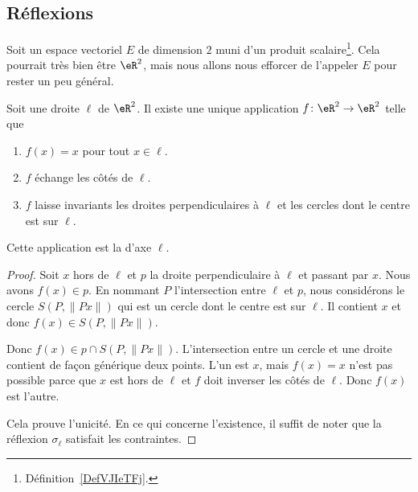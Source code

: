 \subsection{Réflexions}

Soit un espace vectoriel \( E\) de dimension \( 2\) muni d'un produit scalaire\footnote{Définition~\ref{DefVJIeTFj}.}. Cela pourrait très bien être \( \eR^2\), mais nous allons nous efforcer de l'appeler \( E\) pour rester un peu général.

\begin{lemmaDef}        \label{DEFooLJKDooUaamen}
    Soit une droite \( \ell\) de \( \eR^2\). Il existe une unique application \( f\colon \eR^2\to \eR^2\) telle que
    \begin{enumerate}
        \item
            \( f(x)=x\) pour tout \( x\in \ell\).
        \item
            \( f\) échange les côtés de \( \ell\).
        \item
            \( f\) laisse invariants les droites perpendiculaires à \( \ell\) et les cercles dont le centre est sur \( \ell\).
    \end{enumerate}
    Cette application est la  d'axe \( \ell\).
\end{lemmaDef}

\begin{proof}
    Soit \( x\) hors de \( \ell\) et \( p\) la droite perpendiculaire à \( \ell\) et passant par \( x\). Nous avons \( f(x)\in p\). En nommant \( P\) l'intersection entre \( \ell\) et \( p\), nous considérons le cercle \( S(P,\| Px \|)\) qui est un cercle dont le centre est sur \( \ell\). Il contient \( x\) et donc \( f(x)\in S(P,\| Px \|)\).

    Donc \( f(x)\in p\cap S(P,\| Px \|)\). L'intersection entre un cercle et une droite contient de façon générique deux points. L'un est \( x\), mais \( f(x)=x\) n'est pas possible parce que \( x\) est hors de \( \ell\) et \( f\) doit inverser les côtés de \( \ell\). Donc \( f(x)\) est l'autre.

    Cela prouve l'unicité. En ce qui concerne l'existence, il suffit de noter que la réflexion \( \sigma_{\ell}\) satisfait les contraintes.
\end{proof}

